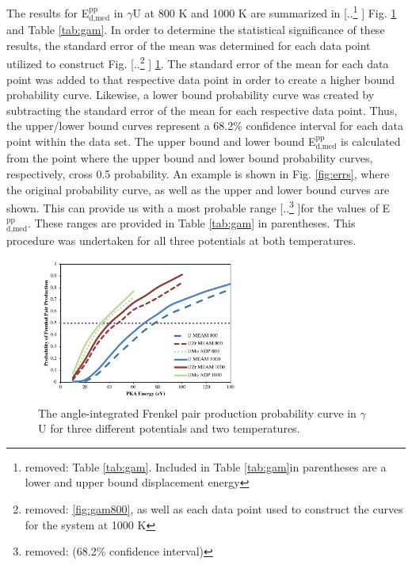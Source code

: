 \documentclass[review]{elsarticle}
\providecommand{\DIFaddtex}[1]{{\protect\color{blue} \sf #1}} %
\providecommand{\DIFdeltex}[1]{{\protect\color{red} [..\footnote{removed: #1} ]}} %
\providecommand{\DIFaddbegin}{} %
\providecommand{\DIFaddend}{} %
\providecommand{\DIFdelbegin}{} %
\providecommand{\DIFdelend}{} %
\providecommand{\DIFaddFL}[1]{\DIFadd{#1}} %
\providecommand{\DIFadd}[1]{\texorpdfstring{\DIFaddtex{#1}}{#1}} %
\providecommand{\DIFdel}[1]{\texorpdfstring{\DIFdeltex{#1}}{}} %
\newcommand{\DIFscaledelfig}{0.5}
\newlength{\DIFdelgraphicswidth} %
\newlength{\DIFdelgraphicsheight} %
\newcommand{\DIFaddincludegraphics}[2][]{{\color{blue}\fbox{\DIFOincludegraphics[#1]{#2}}}} %
\newcommand{\DIFdelincludegraphics}[2][]{%
\sbox{\DIFdelgraphicsbox}{\DIFOincludegraphics[#1]{#2}}%
\settoboxwidth{\DIFdelgraphicswidth}{\DIFdelgraphicsbox} %
\settoboxtotalheight{\DIFdelgraphicsheight}{\DIFdelgraphicsbox} %
\scalebox{\DIFscaledelfig}{%
\parbox[b]{\DIFdelgraphicswidth}{\usebox{\DIFdelgraphicsbox}\\[-\baselineskip] \rule{\DIFdelgraphicswidth}{0em}}\llap{\resizebox{\DIFdelgraphicswidth}{\DIFdelgraphicsheight}{%
\setlength{\unitlength}{\DIFdelgraphicswidth}%
\begin{picture}(1,1)%
\thicklines\linethickness{2pt} %
{\color[rgb]{1,0,0}\put(0,0){\framebox(1,1){}}}%
{\color[rgb]{1,0,0}\put(0,0){\line( 1,1){1}}}%
{\color[rgb]{1,0,0}\put(0,1){\line(1,-1){1}}}%
\end{picture}%
}\hspace*{3pt}}} %
} %
\DeclareRobustCommand{\DIFaddbegin}{\DIFOaddbegin \let\includegraphics\DIFaddincludegraphics} %
\DeclareRobustCommand{\DIFaddend}{\DIFOaddend \let\includegraphics\DIFOincludegraphics} %
\DeclareRobustCommand{\DIFdelbegin}{\DIFOdelbegin \let\includegraphics\DIFdelincludegraphics} %
\DeclareRobustCommand{\DIFdelend}{\DIFOaddend \let\includegraphics\DIFOincludegraphics} %
\begin{document}
The results for E$^{\textrm{pp}}_{\textrm{d,med}}$ in $\gamma$U at 800 K and 1000 K are summarized in \DIFdelbegin \DIFdel{Table \ref{tab:gam}. Included in Table \ref{tab:gam}in parentheses are a lower and upper bound displacement energy}\DIFdelend \DIFaddbegin \DIFadd{Fig. \ref{fig:800_1000} and Table \ref{tab:gam}}\DIFaddend . In order to determine the statistical significance of these results, the standard error of the mean was determined for each data point utilized to construct Fig. \DIFdelbegin \DIFdel{\ref{fig:gam800}, as well as each data point used to construct the curves for the system at 1000 K}\DIFdelend \DIFaddbegin \DIFadd{\ref{fig:800_1000}}\DIFaddend . The standard error of the mean for each data point was added to that respective data point in order to create a higher bound probability curve. Likewise, a lower bound probability curve was created by subtracting the standard error of the mean for each respective data point. \DIFaddbegin \DIFadd{Thus, the upper/lower bound curves represent a 68.2\% confidence interval for each data point within the data set. }\DIFaddend The upper bound and lower bound E$^{\textrm{pp}}_{\textrm{d,med}}$ is calculated from the point where the upper bound and lower bound probability curves, respectively, cross 0.5 probability. \DIFaddbegin \DIFadd{An example is shown in Fig. \ref{fig:errs}, where the original probability curve, as well as the upper and lower bound curves are shown. }\DIFaddend This can provide us with a most probable range \DIFdelbegin \DIFdel{(68.2\% confidence interval) }\DIFdelend for the values of E$^{\textrm{pp}}_{\textrm{d,med}}$. These ranges are provided in Table \ref{tab:gam} in parentheses. \DIFaddbegin \DIFadd{This procedure was undertaken for all three potentials at both temperatures.
}\DIFaddend 

\DIFaddbegin \begin{figure}[h]
 \centering
 \includegraphics[width=0.6\textwidth]{800_1000.png} 
 \caption{\DIFaddFL{The angle-integrated Frenkel pair production probability curve in $\gamma$U for three different potentials and two temperatures.}}
 \label{fig:800_1000}
\end{figure}
\end{document}
